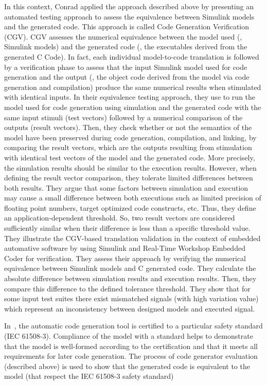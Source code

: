 In this context, Conrad \etal\cite{conrad2010code} applied the approach described above by presenting an automated testing approach to assess the equivalence between Simulink models and the generated code. This approach is called Code Generation Verification (CGV).
CGV assesses the numerical equivalence between the model used (\ie, Simulink models) and the generated code (\ie, the executables derived from the generated C Code). 
In fact, each individual model-to-code translation is followed by a verification phase to assess that the input Simulink model used for code generation and the output (\ie, the object code derived from the model via code generation and compilation) produce the same numerical results when stimulated with identical inputs. 
In their equivalence testing approach, they use to run the model used for code generation using simulation and the generated code with the same input stimuli (test vectors) followed by a numerical comparison of the outputs (result vectors).
Then, they check whether or not the semantics of the model have been preserved during code generation, compilation, and linking, by comparing the result vectors, which are the outputs resulting from stimulation with identical test vectors of the model and the generated code.
More precisely, the simulation results should be similar to the execution results. However, when defining the result vector comparison, they tolerate limited differences between both results. They argue that some factors between simulation and execution may cause a small difference between both executions such as limited precision of floating point numbers, target optimized code constructs, etc. 
Thus, they define an application-dependent threshold. So, two result vectors are considered sufficiently similar when their difference is less than a specific threshold value.
They illustrate the CGV-based translation validation in the context of embedded automative software by using Simulink and Real-Time Workshop Embedded Coder for verification. They assess their approach by verifying the numerical equivalence between Simulink models and C generated code. They calculate the absolute difference between simulation results and execution results. Then, they compare this difference to the defined tolerance threshold. They show that for some input test suites there exist mismatched signals (with high variation value) which represent an inconsistency between designed models and executed signal.

In~\cite{conrad2009testing}, the automatic code generation tool is certified to a particular safety standard (IEC 61508-3). Compliance of the model with a standard helps to demonstrate that the model is well-formed according to the certification and that it meets all requirements for later code generation. The process of code generator evaluation (described above) is used to show that the generated code is equivalent to the model (that respect the IEC 61508-3 safety standard)

